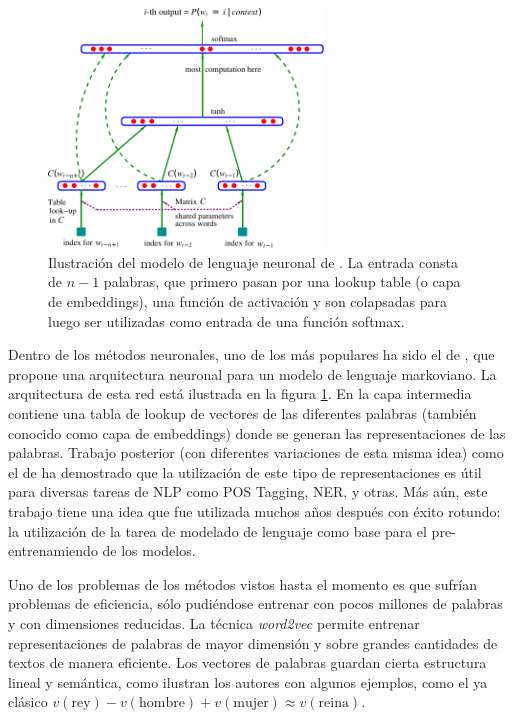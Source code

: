 \begin{figure}
    \centering
    \includegraphics[width=0.65\textwidth]{img/02/bengio_neural_language_model.pdf}
    \caption{Ilustración del modelo de lenguaje neuronal de \citet{bengio2003neural}. La entrada consta de $n-1$ palabras, que primero pasan por una lookup table (o capa de embeddings), una función de activación y son colapsadas para luego ser utilizadas como entrada de una función softmax.}
    \label{fig:bengio_neural_language_model}

\end{figure}

Dentro de los métodos neuronales, uno de los más populares ha sido el de \citet{bengio2003neural}, que propone una arquitectura neuronal para un modelo de lenguaje markoviano. La arquitectura de esta red está ilustrada en la figura \ref{fig:bengio_neural_language_model}. En la capa intermedia contiene una tabla de lookup de vectores de las diferentes palabras (también conocido como capa de embeddings) donde se generan las representaciones de las palabras. Trabajo posterior (con diferentes variaciones de esta misma idea) como el de \citet{collobert2011natural} ha demostrado que la utilización de este tipo de representaciones es útil para diversas tareas de NLP como POS Tagging, NER, y otras. Más aún, este trabajo tiene una idea que fue utilizada muchos años después con éxito rotundo: la utilización de la tarea de modelado de lenguaje como base para el pre-entrenamiendo de los modelos.

Uno de los problemas de los métodos vistos hasta el momento es que sufrían problemas de eficiencia, sólo pudiéndose entrenar con pocos millones de palabras y con dimensiones reducidas. La técnica \emph{word2vec} \cite{mikolov2013efficient} permite entrenar representaciones de palabras de mayor dimensión y sobre grandes cantidades de textos de manera eficiente. Los vectores de palabras guardan cierta estructura lineal y semántica, como ilustran los autores con algunos ejemplos, como el ya clásico $v(\text{rey}) - v(\text{hombre}) + v(\text{mujer}) \approx v(\text{reina})$.

